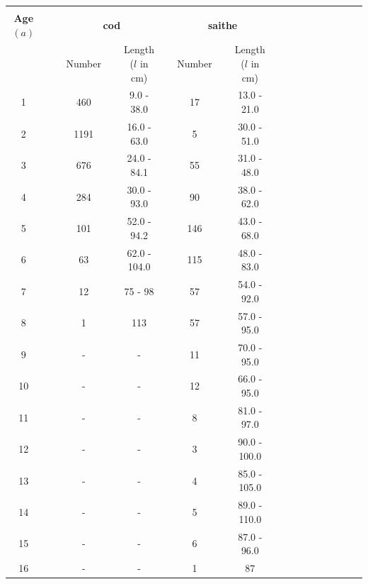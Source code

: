 \documentclass[a4paper 12pt]{article}
\numberwithin{equation}{section}
\begin{document}
\begin{table}[h!]
\centering
\setlength\tabcolsep{1.5pt} 
\begin{tabular}{ccccccccccccccccccc}
\hline \\
{\bf Age $(a)$} &&& \multicolumn{3}{c}{\bf cod} && \multicolumn{3}{c}{\bf saithe} \\[1.5ex]
 &&& Number   && Length ($l$ in cm)  && Number   && Length ($l$ in cm)      \\[1.5ex]
\cmidrule(lr{0.5em}){4-6} \cmidrule(lr{0.5em}){7-10}
1   &&&  460  &&  9.0 - 38.0   &&  17    &&  13.0 - 21.0     \\[1.5ex]
2   &&&  1191 &&  16.0 - 63.0  &&  5    &&  30.0 - 51.0  \\[1.5ex]
3   &&&  676  &&  24.0 - 84.1  &&  55   &&  31.0 - 48.0  \\[1.5ex]
4   &&&  284  &&  30.0 - 93.0  &&  90   &&  38.0 - 62.0  \\[1.5ex]
5   &&&  101  &&  52.0 - 94.2  &&  146  &&  43.0 - 68.0  \\[1.5ex]
6   &&&  63   &&  62.0 - 104.0 &&  115  &&  48.0 - 83.0  \\[1.5ex]
7   &&&  12   &&  75 - 98      &&  57   &&  54.0 - 92.0 \\[0.5ex]
8   &&&  1    &&   113         &&  57   &&  57.0 - 95.0 \\[0.5ex]
9   &&&  -    &&  -            &&  11   &&  70.0 - 95.0 \\[0.5ex]
10   &&&  -   &&  -            &&  12   &&  66.0 - 95.0 \\[0.5ex]
11   &&&  -   &&  -            &&  8    &&  81.0 - 97.0 \\[0.5ex]
12   &&&  -   &&  -            &&  3    &&  90.0 - 100.0 \\[0.5ex]
13   &&&  -   &&  -            &&  4    &&  85.0 - 105.0 \\[0.5ex]
14   &&&  -   &&  -            &&  5    &&  89.0 - 110.0 \\[0.5ex]
15   &&&  -   &&  -            &&  6    &&  87.0 - 96.0 \\[0.5ex]
16   &&&  -   &&  -            &&  1    &&   87 \\[0.5ex]
\hline
\end{tabular}
\end{table}
\end{document}
